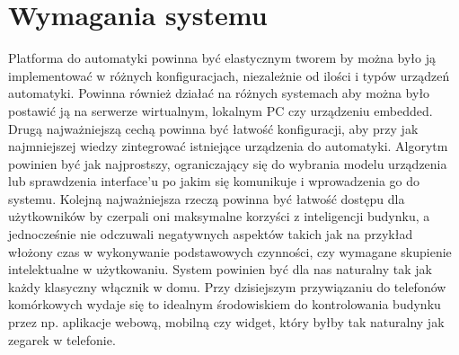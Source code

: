 \chapter{Wymagania systemu}
Platforma do automatyki powinna być elastycznym tworem by można było ją implementować w różnych konfiguracjach,  niezależnie od ilości i typów urządzeń automatyki. Powinna również działać na różnych systemach aby można było postawić ją na serwerze wirtualnym, lokalnym PC czy urządzeniu embedded. Drugą najważniejszą cechą powinna być łatwość konfiguracji, aby przy jak najmniejszej wiedzy zintegrować istniejące urządzenia do automatyki. Algorytm powinien być jak najprostszy, ograniczający się do wybrania modelu urządzenia lub sprawdzenia interface'u po jakim się komunikuje i wprowadzenia go do systemu. Kolejną najważniejsza rzeczą powinna być łatwość dostępu dla użytkowników by czerpali oni maksymalne korzyści z inteligencji budynku, a jednocześnie nie odczuwali negatywnych aspektów takich jak na przykład włożony czas w wykonywanie podstawowych czynności, czy wymagane skupienie intelektualne w użytkowaniu. System powinien być dla nas naturalny tak jak każdy klasyczny włącznik w domu. Przy dzisiejszym przywiązaniu do telefonów komórkowych wydaje się to idealnym środowiskiem do kontrolowania budynku przez np. aplikacje webową, mobilną czy widget, który byłby tak naturalny jak zegarek w telefonie.